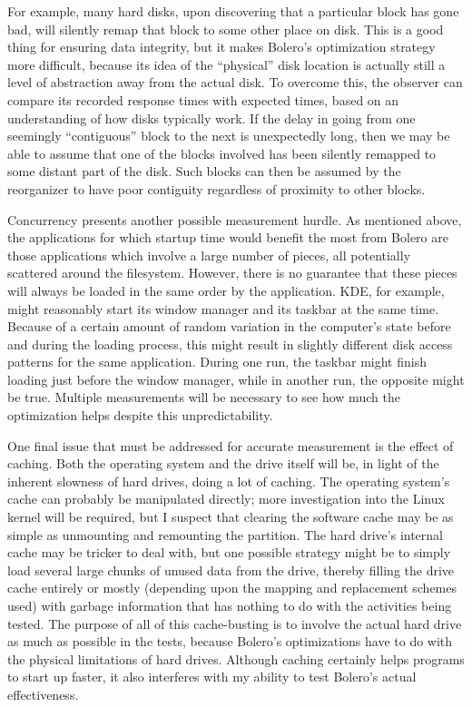 \documentclass[10pt,twocolumn,letterpaper]{article}
\begin{document}
For example, many hard disks, upon discovering that a particular block has gone bad, will silently
remap that block to some other place on disk\cite{remapping}. This is a good thing for ensuring
data integrity, but it makes Bolero's optimization strategy more difficult, because
its idea of the ``physical'' disk location is actually still a level of abstraction away from
the actual disk. To overcome this, the observer can compare its recorded response
times with expected times, based on an understanding of how disks typically work.
If the delay in going from one seemingly ``contiguous'' block to the next
is unexpectedly long, then we may be able to assume that one of the blocks involved
has been silently remapped to some distant part of the disk. Such blocks can then be
assumed by the reorganizer to have poor contiguity regardless of proximity to other
blocks.

Concurrency presents another possible measurement hurdle. As mentioned above, the applications for
which startup time would benefit the most from Bolero are those applications which involve a
large number of pieces, all potentially scattered around the filesystem. However, there is no guarantee
that these pieces will always be loaded in the same order by the application. KDE, for example, might reasonably start its window manager and its taskbar at the same time. Because of a certain amount of random
variation in the computer's state before and during the loading process, this might result in
slightly different disk access patterns for the same application. During one run, the taskbar might finish loading just before the window manager, while in another run, the opposite might be true. Multiple
measurements will be necessary to see how much the optimization helps despite this unpredictability.

One final issue that must be addressed for accurate measurement is the effect of caching. Both
the operating system and the drive itself will be, in light of the inherent slowness of hard drives,
doing a lot of caching. The operating system's cache can probably be manipulated directly; more
investigation into the Linux kernel will be required, but I suspect that clearing the software
cache may be as simple as unmounting and remounting the partition. The hard drive's internal cache
may be tricker to deal with, but one possible strategy might be to simply load several large chunks of
unused data from the drive, thereby filling the drive cache entirely or mostly (depending upon the mapping
and replacement schemes used) with garbage information that has nothing to do with the activities being tested.
The purpose of all of this cache-busting is to involve the actual hard drive as much as possible
in the tests, because Bolero's optimizations have to do with the physical limitations of hard drives. Although caching certainly helps programs to start up faster, it also interferes with my ability to test Bolero's actual effectiveness.
\end{document}
